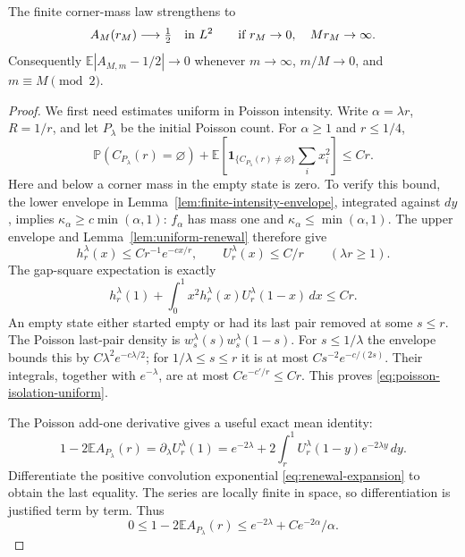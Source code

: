 \documentclass[11pt,letterpaper]{article}
\newcommand{\PP}{\mathbb P}\newcommand{\EE}{\mathbb E}
\newcommand{\ind}{\mathbf 1}\newcommand{\Exp}{\operatorname{Exp}}
\begin{document}
\begin{lemma}
\label{lem:full-corner-law}
The finite corner-mass law strengthens to
\[
 A_M(r_M)\longrightarrow\tfrac12\quad\hbox{in }L^2
 \qquad\hbox{if }r_M\to0,\quad Mr_M\to\infty.
\]
Consequently $\EE|A_{M,m}-1/2|\to0$ whenever $m\to\infty$,
$m/M\to0$, and $m\equiv M\pmod2$.
\end{lemma}
\begin{proof}
We first need estimates uniform in Poisson intensity. Write
$\alpha=\lambda r$, $R=1/r$, and let $P_\lambda$ be the initial
Poisson count. For $\alpha\ge1$ and $r\le1/4$,
\begin{equation}\label{eq:poisson-isolation-uniform}
 \PP(C_{P_\lambda}(r)=\varnothing)
 +\EE\!\left[\ind_{\{C_{P_\lambda}(r)\ne\varnothing\}}
                      \sum_i x_i^2\right]\le Cr.
\end{equation}
Here and below a corner mass in the empty state is zero.
To verify this bound, the lower envelope in
Lemma~\ref{lem:finite-intensity-envelope}, integrated against $dy$,
implies $\kappa_\alpha\ge c\min(\alpha,1)$: $f_\alpha$ has mass
one and $\kappa_\alpha\le\min(\alpha,1)$.
The upper envelope and Lemma~\ref{lem:uniform-renewal} therefore give
\[
 h_r^\lambda(x)\le Cr^{-1}e^{-cx/r},\qquad
 U_r^\lambda(x)\le C/r\qquad(\lambda r\ge1).
\]
The gap-square expectation is exactly
\[
 h_r^\lambda(1)+\int_0^1x^2h_r^\lambda(x)
                                  U_r^\lambda(1-x)\,dx\le Cr.
\]
An empty state either started empty or had its last pair removed at
some $s\le r$. The Poisson last-pair density is
$w_s^\lambda(s)w_s^\lambda(1-s)$. For $s\le1/\lambda$ the envelope
bounds this by $C\lambda^2e^{-c\lambda/2}$; for
$1/\lambda\le s\le r$ it is at most $Cs^{-2}e^{-c/(2s)}$.
Their integrals, together with $e^{-\lambda}$, are at most
$Ce^{-c'/r}\le Cr$. This proves \eqref{eq:poisson-isolation-uniform}.

The Poisson add-one derivative gives a useful exact mean identity:
\[
 1-2\EE A_{P_\lambda}(r)
   =\partial_\lambda U_r^\lambda(1)
   =e^{-2\lambda}
       +2\int_r^1U_r^\lambda(1-y)e^{-2\lambda y}\,dy.
\]
Differentiate the positive convolution exponential
\eqref{eq:renewal-expansion} to obtain the last equality.
The series are locally finite in space, so differentiation is
justified term by term. Thus
\begin{equation}\label{eq:poisson-corner-mean}
 0\le1-2\EE A_{P_\lambda}(r)
       \le e^{-2\lambda}+C e^{-2\alpha}/\alpha.
\end{equation}


\end{proof}
\end{document}
